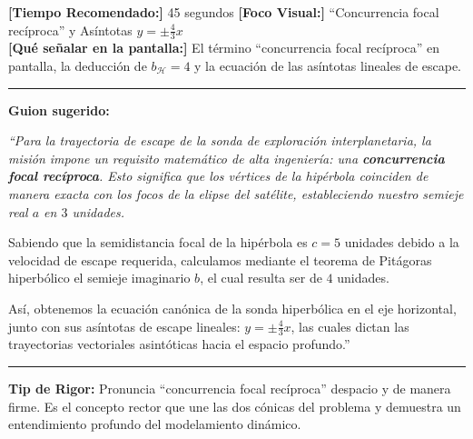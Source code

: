 \documentclass[12pt,letterpaper]{article}
\begin{document}
\newpage

\begin{tcolorbox}[colframe=USSBlue, colback=white, title=\textbf{DIAPOSITIVA 24: Órbita de la Sonda Hiperbólica (Pág. 24)}, coltitle=white]
    \small
    \textbf{[Tiempo Recomendado:]} 45 segundos \hfill \textbf{[Foco Visual:]} ``Concurrencia focal recíproca'' y Asíntotas $y = \pm \frac{4}{3}x$ \\
    \textbf{[Qué señalar en la pantalla:]} El término ``concurrencia focal recíproca'' en pantalla, la deducción de $b_{\mathcal{H}} = 4$ y la ecuación de las asíntotas lineales de escape.
    \hrule\vspace{0.2cm}
    \textbf{Guion sugerido:}
    \medskip
    
    {\itshape
    ``Para la trayectoria de escape de la sonda de exploración interplanetaria, la misión impone un requisito matemático de alta ingeniería: una \textbf{concurrencia focal recíproca}. Esto significa que los vértices de la hipérbola coinciden de manera exacta con los focos de la elipse del satélite, estableciendo nuestro semieje real $a$ en $3$ unidades.
    
    Sabiendo que la semidistancia focal de la hipérbola es $c=5$ unidades debido a la velocidad de escape requerida, calculamos mediante el teorema de Pitágoras hiperbólico el semieje imaginario $b$, el cual resulta ser de $4$ unidades.
    
    Así, obtenemos la ecuación canónica de la sonda hiperbólica en el eje horizontal, junto con sus asíntotas de escape lineales: $y = \pm \frac{4}{3}x$, las cuales dictan las trayectorias vectoriales asintóticas hacia el espacio profundo.''}
    \vspace{0.2cm}\hrule\vspace{0.15cm}
    \textbf{Tip de Rigor:} Pronuncia ``concurrencia focal recíproca'' despacio y de manera firme. Es el concepto rector que une las dos cónicas del problema y demuestra un entendimiento profundo del modelamiento dinámico.
\end{tcolorbox}

\vspace{0.3cm}
\end{document}
